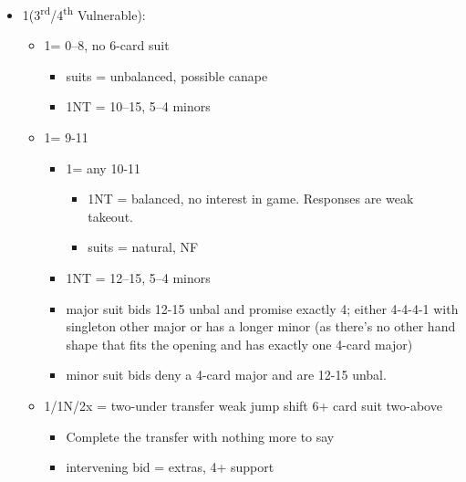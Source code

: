 \documentclass[a4paper,14pt]{extarticle}
\begin{document}
\begin{itemize}
\item 1\clubs (3\textsuperscript{rd}/4\textsuperscript{th} Vulnerable):
	\begin{itemize}
   \item 1\diamonds = 0--8, no 6-card suit
		\begin{itemize}
      \item suits = unbalanced, possible canape
      \item 1NT = 10--15, 5--4 minors
		\end{itemize}
   \item 1\hearts = 9-11
		\begin{itemize}
      \item 1\spades = any 10-11
			\begin{itemize}
			\item 1NT = balanced, no interest in game. Responses are weak takeout.
			\item suits = natural, NF
			\end{itemize}
      \item 1NT = 12--15, 5--4 minors
      \item major suit bids 12-15 unbal and promise exactly 4; either 4-4-4-1
            with singleton other major or has a longer minor (as there's no other
            hand shape that fits the opening and has exactly one 4-card major)
      \item minor suit bids deny a 4-card major and are 12-15 unbal.
		\end{itemize}
   \item 1\spades/1N/2x = two-under transfer weak jump shift 6+ card suit two-above
		\begin{itemize}
		\item Complete the transfer with nothing more to say
		\item intervening bid = extras, 4+ support
		\end{itemize}
	\end{itemize}

\newpage


\end{itemize}
\end{document}
